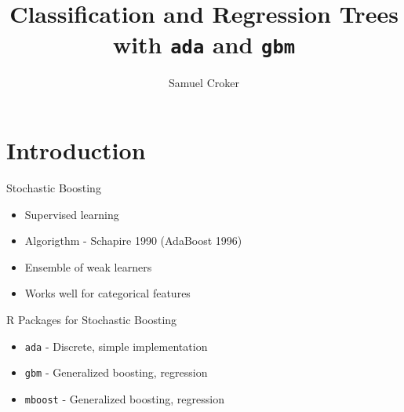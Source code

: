 \documentclass{beamer}
\title[Classification and Regression Trees\\ with \texttt{ada} and \texttt{gbm}] %
{Classification and Regression Trees\\ with \texttt{ada} and \texttt{gbm}}
\author
{Samuel Croker}
\begin{document}
\begin{frame}
  \titlepage
\end{frame}






\section{Introduction}

\begin{frame}{Stochastic Boosting}
\begin{itemize}
\item Supervised learning
\item Algorigthm - Schapire 1990 (AdaBoost 1996)
\item Ensemble of weak learners
\item Works well for categorical features
\end{itemize}
\end{frame}


\begin{frame}{R Packages for Stochastic Boosting}

\begin{itemize}
	\item \texttt{ada} - Discrete, simple implementation
	\item \texttt{gbm} - Generalized boosting, regression 
	\item \texttt{mboost} - Generalized boosting, regression 
\end{itemize}
\end{frame}
\end{document}
